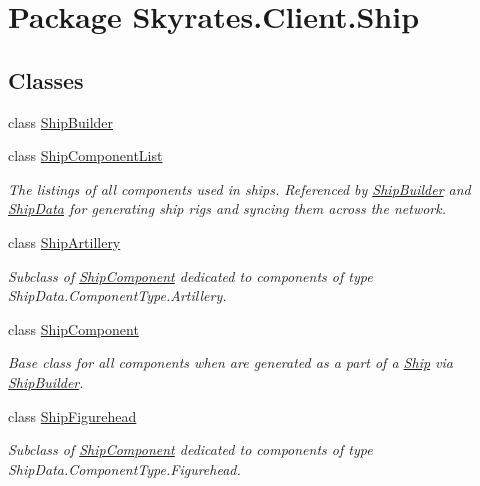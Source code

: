 \hypertarget{namespace_skyrates_1_1_client_1_1_ship}{\section{Package Skyrates.\-Client.\-Ship}
\label{namespace_skyrates_1_1_client_1_1_ship}
}
\subsection*{Classes}
\begin{DoxyCompactItemize}
\item 
class \hyperlink{class_skyrates_1_1_client_1_1_ship_1_1_ship_builder}{Ship\-Builder}
\item 
class \hyperlink{class_skyrates_1_1_client_1_1_ship_1_1_ship_component_list}{Ship\-Component\-List}
\begin{DoxyCompactList}\small\item\em The listings of all components used in ships. Referenced by \hyperlink{class_skyrates_1_1_client_1_1_ship_1_1_ship_builder}{Ship\-Builder} and \hyperlink{class_ship_data}{Ship\-Data} for generating ship rigs and syncing them across the network. \end{DoxyCompactList}\item 
class \hyperlink{class_skyrates_1_1_client_1_1_ship_1_1_ship_artillery}{Ship\-Artillery}
\begin{DoxyCompactList}\small\item\em Subclass of \hyperlink{class_skyrates_1_1_client_1_1_ship_1_1_ship_component}{Ship\-Component} dedicated to components of type Ship\-Data.\-Component\-Type.\-Artillery. \end{DoxyCompactList}\item 
class \hyperlink{class_skyrates_1_1_client_1_1_ship_1_1_ship_component}{Ship\-Component}
\begin{DoxyCompactList}\small\item\em Base class for all components when are generated as a part of a \hyperlink{class_skyrates_1_1_client_1_1_ship_1_1_ship}{Ship} via \hyperlink{class_skyrates_1_1_client_1_1_ship_1_1_ship_builder}{Ship\-Builder}. \end{DoxyCompactList}\item 
class \hyperlink{class_skyrates_1_1_client_1_1_ship_1_1_ship_figurehead}{Ship\-Figurehead}
\begin{DoxyCompactList}\small\item\em Subclass of \hyperlink{class_skyrates_1_1_client_1_1_ship_1_1_ship_component}{Ship\-Component} dedicated to components of type Ship\-Data.\-Component\-Type.\-Figurehead. \end{DoxyCompactList}\item 

\end{DoxyCompactItemize}
